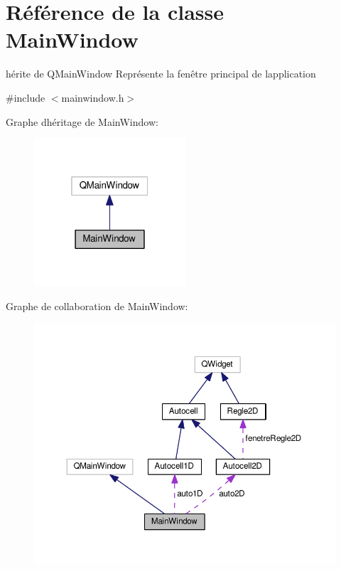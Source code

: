 \hypertarget{class_main_window}{}\section{Référence de la classe Main\+Window}
\label{class_main_window}


hérite de Q\+Main\+Window Représente la fenêtre principal de l\textquotesingle{}application  




{\ttfamily \#include $<$mainwindow.\+h$>$}



Graphe d\textquotesingle{}héritage de Main\+Window\+:\nopagebreak
\begin{figure}[H]
\begin{center}
\leavevmode
\includegraphics[width=160pt]{class_main_window__inherit__graph}
\end{center}
\end{figure}


Graphe de collaboration de Main\+Window\+:
\nopagebreak
\begin{figure}[H]
\begin{center}
\leavevmode
\includegraphics[width=350pt]{class_main_window__coll__graph}
\end{center}
\end{figure}
